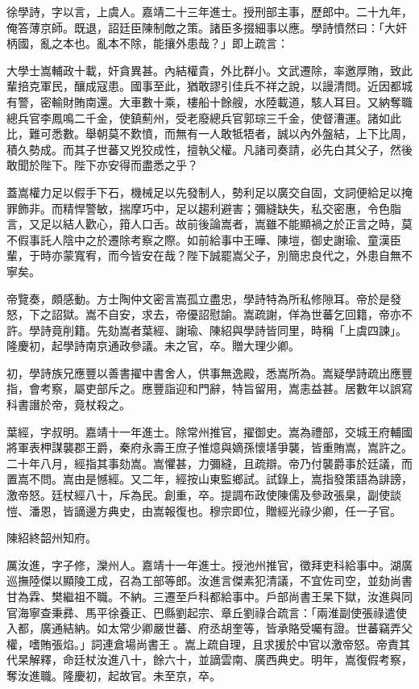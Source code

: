 \begin{pinyinscope}
徐學詩，字以言，上虞人。嘉靖二十三年進士。授刑部主事，歷郎中。二十九年，俺答薄京師。既退，詔廷臣陳制敵之策。諸臣多掇細事以應。學詩憤然曰：「大奸柄國，亂之本也。亂本不除，能攘外患哉？」即上疏言：

大學士嵩輔政十載，奸貪異甚。內結權貴，外比群小。文武遷除，率邀厚賄，致此輩掊克軍民，釀成寇患。國事至此，猶敢謬引佳兵不祥之說，以謾清問。近因都城有警，密輸財賄南還。大車數十乘，樓船十餘艘，水陸載道，駭人耳目。又納奪職總兵官李鳳鳴二千金，使鎮薊州，受老廢總兵官郭琮三千金，使督漕運。諸如此比，難可悉數。舉朝莫不歎憤，而無有一人敢牴牾者，誠以內外盤結，上下比周，積久勢成。而其子世蕃又兇狡成性，擅執父權。凡諸司奏請，必先白其父子，然後敢聞於陛下。陛下亦安得而盡悉之乎？

蓋嵩權力足以假手下石，機械足以先發制人，勢利足以廣交自固，文詞便給足以掩罪飾非。而精悍警敏，揣摩巧中，足以趨利避害；彌縫缺失，私交密惠，令色脂言，又足以結人歡心，箝人口舌。故前後論嵩者，嵩雖不能顯禍之於正言之時，莫不假事託人陰中之於遷除考察之際。如前給事中王曄、陳塏，御史謝瑜、童漢臣輩，于時亦蒙寬宥，而今皆安在哉？陛下誠罷嵩父子，別簡忠良代之，外患自無不寧矣。

帝覽奏，頗感動。方士陶仲文密言嵩孤立盡忠，學詩特為所私修隙耳。帝於是發怒，下之詔獄。嵩不自安，求去，帝優詔慰諭。嵩疏謝，佯為世蕃乞回籍，帝亦不許。學詩竟削籍。先劾嵩者葉經、謝瑜、陳紹與學詩皆同里，時稱「上虞四諫」。隆慶初，起學詩南京通政參議。未之官，卒。贈大理少卿。

初，學詩族兄應豐以善書擢中書舍人，供事無逸殿，悉嵩所為。嵩疑學詩疏出應豐指，會考察，屬吏部斥之。應豐詣迎和門辭，特旨留用，嵩恚益甚。居數年以誤寫科書譖於帝，竟杖殺之。

葉經，字叔明。嘉靖十一年進士。除常州推官，擢御史。嵩為禮部，交城王府輔國將軍表柙謀襲郡王爵，秦府永壽王庶子惟燱與嫡孫懷墡爭襲，皆重賄嵩，嵩許之。二十年八月，經指其事劾嵩。嵩懼甚，力彌縫，且疏辯。帝乃付襲爵事於廷議，而置嵩不問。嵩由是憾經。又二年，經按山東監鄉試。試錄上，嵩指發策語為誹謗，激帝怒。廷杖經八十，斥為民。創重，卒。提調布政使陳儒及參政張臬，副使談愷、潘恩，皆謫邊方典史，由嵩報復也。穆宗即位，贈經光祿少卿，任一子官。

陳紹終韶州知府。

厲汝進，字子修，灤州人。嘉靖十一年進士。授池州推官，徵拜吏科給事中。湖廣巡撫陸傑以顯陵工成，召為工部等郎。汝進言傑素犯清議，不宜佐司空，並劾尚書甘為霖、樊繼祖不職。不納。三遷至戶科都給事中。戶部尚書王杲下獄，汝進與同官海寧查秉彞、馬平徐養正、巴縣劉起宗、章丘劉祿合疏言：「兩淮副使張祿遣使入都，廣通結納。如太常少卿嚴世蕃、府丞胡奎等，皆承賂受囑有證。世蕃竊弄父權，嗜賄張焰。」詞連倉場尚書王。嵩上疏自理，且求援於中官以激帝怒。帝責其代杲解釋，命廷杖汝進八十，餘六十，並謫雲南、廣西典史。明年，嵩復假考察，奪汝進職。隆慶初，起故官。未至京，卒。


\end{pinyinscope}
